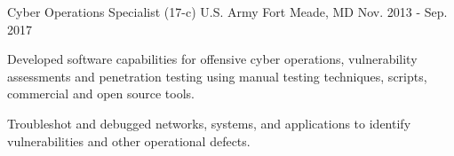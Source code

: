 \begin{cventries}
  \cventry
    {Cyber Operations Specialist (17-c)} %
    {U.S. Army} %
    {Fort Meade, MD} %
    {Nov. 2013 - Sep. 2017} %
    {
      \begin{cvitems} %
        \item {Developed software capabilities for offensive cyber operations, vulnerability assessments and penetration testing using manual testing techniques, scripts, commercial and open source tools.}
        \item {Troubleshot and debugged networks, systems, and applications to identify vulnerabilities and other operational defects.}
      \end{cvitems}
    }

\end{cventries}
